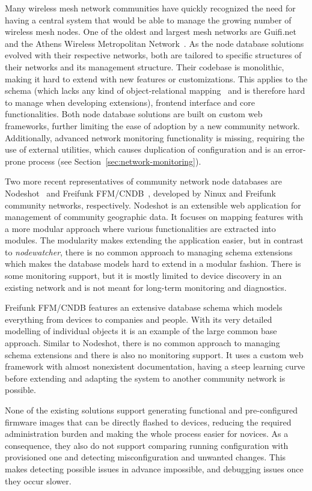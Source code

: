 \documentclass[5p,sort&compress]{elsarticle}
\newcommand{\nodewatcher}{\textit{nodewatcher}}
\begin{document}
Many wireless mesh network communities have quickly recognized the need for having a central system that would be able to manage the growing number of wireless mesh nodes.
One of the oldest and largest mesh networks are Guifi.net~\cite{Guifinode_2003,Vega_2012} and the Athens Wireless Metropolitan Network~\cite{AWMN_WIND_2002}.
As the node database solutions evolved with their respective networks, both are tailored to specific structures of their networks and its management structure.
Their codebase is monolithic, making it hard to extend with new features or customizations.
This applies to the schema (which lacks any kind of object-relational mapping~\cite{ONeil_2008} and is therefore hard to manage when developing extensions), frontend interface and core functionalities.
Both node database solutions are built on custom web frameworks, further limiting the ease of adoption by a new community network.
Additionally, advanced network monitoring functionality is missing, requiring the use of external utilities, which causes duplication of configuration and is an error-prone process (see Section~\ref{sec:network-monitoring}).

Two more recent representatives of community network node databases are Nodeshot~\cite{Nodeshot_2012} and Freifunk FFM/CNDB~\cite{Funkfeuer_2012}, developed by Ninux and Freifunk community networks, respectively.
Nodeshot is an extensible web application for management of community geographic data.
It focuses on mapping features with a more modular approach where various functionalities are extracted into modules.
The modularity makes extending the application easier, but in contrast to \nodewatcher{}, there is no common approach to managing schema extensions which makes the database models hard to extend in a modular fashion.
There is some monitoring support, but it is mostly limited to device discovery in an existing network and is not meant for long-term monitoring and diagnostics.

Freifunk FFM/CNDB features an extensive database schema which models everything from devices to companies and people.
With its very detailed modelling of individual objects it is an example of the large common base approach.
Similar to Nodeshot, there is no common approach to managing schema extensions and there is also no monitoring support.
It uses a custom web framework with almost nonexistent documentation, having a steep learning curve before extending and adapting the system to another community network is possible.

None of the existing solutions support generating functional and pre-configured firmware images that can be directly flashed to devices, reducing the required administration burden and making the whole process easier for novices.
As a consequence, they also do not support comparing running configuration with provisioned one and detecting misconfiguration and unwanted changes.
This makes detecting possible issues in advance impossible, and debugging issues once they occur slower.
\end{document}
